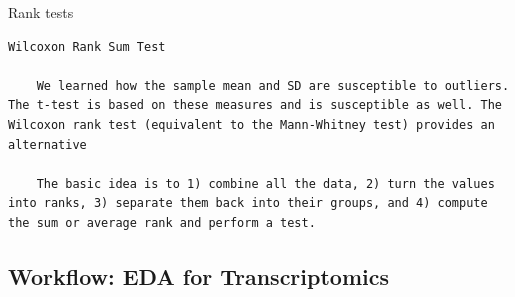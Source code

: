 \documentclass[
]{book}
\begin{document}
Rank tests

\begin{verbatim}
Wilcoxon Rank Sum Test

    We learned how the sample mean and SD are susceptible to outliers. The t-test is based on these measures and is susceptible as well. The Wilcoxon rank test (equivalent to the Mann-Whitney test) provides an alternative

    The basic idea is to 1) combine all the data, 2) turn the values into ranks, 3) separate them back into their groups, and 4) compute the sum or average rank and perform a test.
\end{verbatim}

\hypertarget{workflow-eda-for-transcriptomics}{%
\subsection{Workflow: EDA for Transcriptomics}\label{workflow-eda-for-transcriptomics}}
\end{document}
